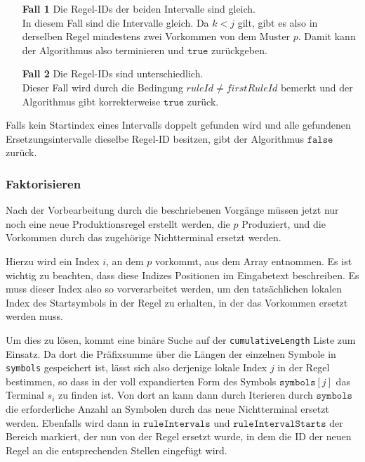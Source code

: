 \begin{enumerate}
	\item[\textbf{Fall 1}] Die Regel-IDs der beiden Intervalle sind gleich.\\
	In diesem Fall sind die Intervalle gleich. Da $k < j$ gilt, gibt es also in derselben Regel mindestens zwei Vorkommen von dem Muster $p$. Damit kann der Algorithmus also terminieren und $\texttt{true}$ zurückgeben.
	\item[\textbf{Fall 2}] Die Regel-IDs sind unterschiedlich.\\
	Dieser Fall wird durch die Bedingung $ruleId \neq firstRuleId$ bemerkt und der Algorithmus gibt korrekterweise $\texttt{true}$ zurück.
\end{enumerate}

Falls kein Startindex eines Intervalls doppelt gefunden wird und alle gefundenen Ersetzungsintervalle dieselbe Regel-ID besitzen, gibt der Algorithmus $\texttt{false}$ zurück.

\subsubsection{Faktorisieren}

Nach der Vorbearbeitung durch die beschriebenen Vorgänge müssen jetzt nur noch eine neue Produktionsregel erstellt werden, die $p$ Produziert, und die Vorkommen durch das zugehörige Nichtterminal ersetzt werden.

Hierzu wird ein Index $i$, an dem $p$ vorkommt, aus dem Array entnommen. Es ist wichtig zu beachten, dass diese Indizes Positionen im Eingabetext beschreiben. Es muss dieser Index also so vorverarbeitet werden, um den tatsächlichen lokalen Index des Startsymbols in der Regel zu erhalten, in der das Vorkommen ersetzt werden muss.

Um dies zu lösen, kommt eine binäre Suche auf der \texttt{cumulativeLength} Liste zum Einsatz. Da dort die Präfixsumme über die Längen der einzelnen Symbole in \texttt{symbols} gespeichert ist, 
lässt sich also derjenige lokale Index $j$ in der Regel bestimmen, so dass in der voll expandierten Form des Symbols $\texttt{symbols}[j]$ das Terminal $s_{i}$ zu finden ist.
Von dort an kann dann durch Iterieren durch $\texttt{symbols}$ die erforderliche Anzahl an Symbolen durch das neue Nichtterminal ersetzt werden.
Ebenfalls wird dann in $\texttt{ruleIntervals}$ und $\texttt{ruleIntervalStarts}$ der Bereich markiert, der nun von der Regel ersetzt wurde, in dem die ID der neuen Regel an die entsprechenden Stellen eingefügt wird.

